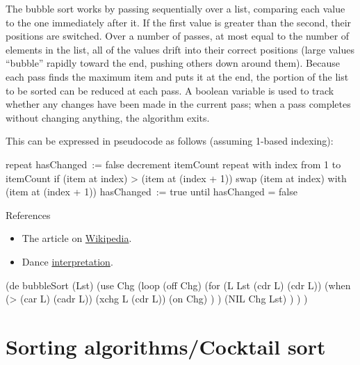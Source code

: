 The bubble sort works by passing sequentially over a list, comparing
each value to the one immediately after it. If the first value is
greater than the second, their positions are switched. Over a number of
passes, at most equal to the number of elements in the list, all of the
values drift into their correct positions (large values ``bubble''
rapidly toward the end, pushing others down around them). Because each
pass finds the maximum item and puts it at the end, the portion of the
list to be sorted can be reduced at each pass. A boolean variable is
used to track whether any changes have been made in the current pass;
when a pass completes without changing anything, the algorithm exits.

This can be expressed in pseudocode as follows (assuming 1-based
indexing):

\begin{wideverbatim}
repeat
    hasChanged := false
    decrement itemCount
    repeat with index from 1 to itemCount
        if (item at index) > (item at (index + 1))
            swap (item at index) with (item at (index + 1))
            hasChanged := true
until hasChanged = false
\end{wideverbatim}

\begin{description}
\item[References]
\end{description}

\begin{itemize}
\item
  The article on
  \href{http://en.wikipedia.org/wiki/Bubble\_sort}{Wikipedia}.
\item
  Dance
  \href{http://www.youtube.com/watch?v=lyZQPjUT5B4\&feature=youtu.be}{interpretation}.
\end{itemize}


\begin{wideverbatim}

(de bubbleSort (Lst)
   (use Chg
      (loop
         (off Chg)
         (for (L Lst (cdr L) (cdr L))
            (when (> (car L) (cadr L))
               (xchg L (cdr L))
               (on Chg) ) )
         (NIL Chg Lst) ) ) )

\end{wideverbatim}

\pagebreak{}
\section*{Sorting algorithms/Cocktail sort}

